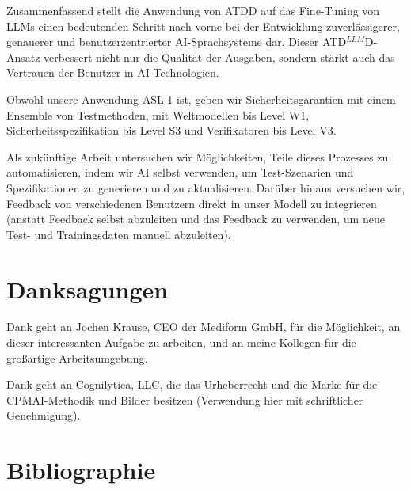 \documentclass[twocolumn]{article}
\newcommand{\ATDLLMD}{ATD$^{LLM}$D}%
\begin{document}
Zusammenfassend stellt die Anwendung von ATDD auf das Fine-Tuning von LLMs einen bedeutenden Schritt nach vorne bei der Entwicklung zuverlässigerer, genauerer und benutzerzentrierter AI-Sprachsysteme dar. Dieser \ATDLLMD{}-Ansatz verbessert nicht nur die Qualität der Ausgaben, sondern stärkt auch das Vertrauen der Benutzer in AI-Technologien.

Obwohl unsere Anwendung ASL-1 ist, geben wir Sicherheitsgarantien mit einem Ensemble von Testmethoden, mit Weltmodellen bis Level W1, Sicherheitsspezifikation bis Level S3 und Verifikatoren bis Level V3.

Als zukünftige Arbeit untersuchen wir Möglichkeiten, Teile dieses Prozesses zu automatisieren, indem wir AI selbst verwenden, um Test-Szenarien und Spezifikationen zu generieren und zu aktualisieren. Darüber hinaus versuchen wir, Feedback von verschiedenen Benutzern direkt in unser Modell zu integrieren (anstatt Feedback selbst abzuleiten und das Feedback zu verwenden, um neue Test- und Trainingsdaten manuell abzuleiten).

\section{Danksagungen}

Dank geht an Jochen Krause, CEO der Mediform GmbH, für die Möglichkeit, an dieser interessanten Aufgabe zu arbeiten, und an meine Kollegen für die großartige Arbeitsumgebung.

Dank geht an Cognilytica, LLC, die das Urheberrecht und die Marke für die CPMAI-Methodik und Bilder besitzen (Verwendung hier mit schriftlicher Genehmigung).

\section{Bibliographie}
\end{document}
